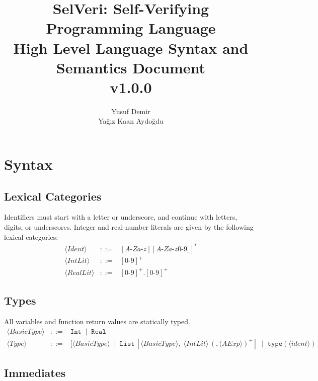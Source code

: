 \documentclass{article}
\title{SelVeri: Self-Verifying Programming Language \\ High Level Language Syntax and Semantics Document \\ v1.0.0}
\author{Yusuf Demir \\ Yağız Kaan Aydoğdu}
\begin{document}
\maketitle


\newpage
\section{Syntax}

\subsection{Lexical Categories}

Identifiers must start with a letter or underscore, and continue with letters, digits, or underscores.
Integer and real-number literals are given by the following lexical categories:
\[
\begin{array}{rcl}
\langle \mathit{Ident} \rangle &::=& [A\texttt{-}Za\texttt{-}z][A\texttt{-}Za\texttt{-}z0\texttt{-}9\_]^* \\
\langle \mathit{IntLit} \rangle &::=& [0\texttt{-}9]^+ \\
\langle \mathit{RealLit} \rangle &::=& [0\texttt{-}9]^+\texttt{.}[0\texttt{-}9]^+
\end{array}
\]

\subsection{Types}

All variables and function return values are statically typed.
\[
\begin{array}{rcl}
\langle \mathit{BasicType} \rangle
&::=&
\mathtt{Int}
\;\mid\;
\mathtt{Real} \\[4pt]



\langle \mathit{Type} \rangle
&::=&
[\langle \mathit{BasicType} \rangle
\;\mid\;
\mathtt{List}\,[\langle \mathit{BasicType} \rangle,\; \langle \mathit{IntLit} \rangle\, (,\langle \mathit{AExp} \rangle)^+]
\;\mid\;
\mathtt{type(\langle \mathit{ident} \rangle)}
\end{array}
\]

\subsection{Immediates}
\end{document}

